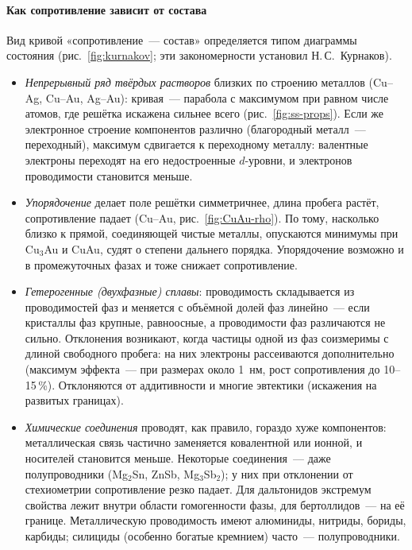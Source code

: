\paragraph{Как сопротивление зависит от состава}
Вид кривой «сопротивление~— состав» определяется типом диаграммы
состояния (рис.~\ref{fig:kurnakov}; эти закономерности установил
Н.\,С.~Курнаков).
\begin{itemize}
\item \emph{Непрерывный ряд твёрдых растворов} близких по строению
металлов (Cu--Ag, Cu--Au, Ag--Au): кривая~— парабола с максимумом при
равном числе атомов, где решётка искажена сильнее всего
(рис.~\ref{fig:ss-props}). Если же электронное строение компонентов
различно (благородный металл~— переходный), максимум сдвигается к
переходному металлу: валентные электроны переходят на его
недостроенные $d$-уровни, и электронов проводимости становится меньше.
\item \emph{Упорядочение} делает поле решётки симметричнее, длина
пробега растёт, сопротивление падает (Cu--Au, рис.~\ref{fig:CuAu-rho}).
По тому, насколько близко к прямой, соединяющей чистые металлы, опускаются
минимумы при Cu$_3$Au и CuAu, судят о степени дальнего порядка. Упорядочение
возможно и в промежуточных фазах и тоже снижает сопротивление.
\item \emph{Гетерогенные (двухфазные) сплавы}: проводимость
складывается из проводимостей фаз и меняется с объёмной долей фаз
линейно~— если кристаллы фаз крупные, равноосные, а проводимости фаз
различаются не сильно. Отклонения возникают, когда частицы одной из фаз
соизмеримы с длиной свободного пробега: на них электроны рассеиваются
дополнительно (максимум эффекта~— при размерах около 1~нм, рост
сопротивления до 10--15\,\%). Отклоняются от аддитивности и многие
эвтектики (искажения на развитых границах).
\item \emph{Химические соединения} проводят, как правило, гораздо хуже
компонентов: металлическая связь частично заменяется ковалентной или
ионной, и носителей становится меньше. Некоторые соединения~— даже
полупроводники (Mg$_2$Sn, ZnSb, Mg$_3$Sb$_2$); у них при отклонении от
стехиометрии сопротивление резко падает. Для дальтонидов экстремум
свойства лежит внутри области гомогенности фазы, для бертоллидов~— на
её границе. Металлическую проводимость имеют алюминиды, нитриды,
бориды, карбиды; силициды (особенно богатые кремнием) часто~—
полупроводники.
\end{itemize}

